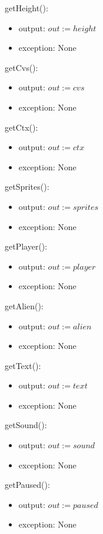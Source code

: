 \documentclass[12pt]{article}
\begin{document}
\indent getHeight():
\begin{itemize}
    \item output: $out := height$
    \item exception: None
\end{itemize}

\noindent getCvs():
\begin{itemize}
    \item output: $out := cvs$
    \item exception: None
\end{itemize}

\noindent getCtx():
\begin{itemize}
    \item output: $out := ctx$
    \item exception: None
\end{itemize}

\noindent getSprites():
\begin{itemize}
    \item output: $out := sprites$
    \item exception: None
\end{itemize}

\noindent getPlayer():
\begin{itemize}
    \item output: $out := player$
    \item exception: None
\end{itemize}

\noindent getAlien():
\begin{itemize}
    \item output: $out := alien$
    \item exception: None
\end{itemize}

\noindent getText():
\begin{itemize}
    \item output: $out := text$
    \item exception: None
\end{itemize}

\noindent getSound():
\begin{itemize}
    \item output: $out := sound$
    \item exception: None
\end{itemize}

\noindent getPaused():
\begin{itemize}
    \item output: $out := paused$
    \item exception: None
\end{itemize}
\end{document}
